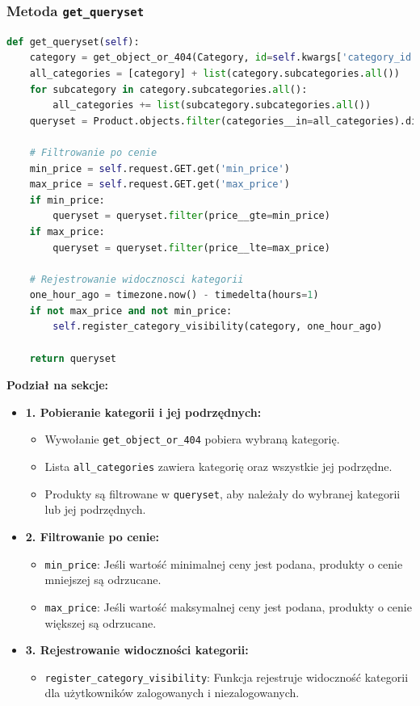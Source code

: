 \documentclass[12pt,a4paper,oneside]{article}
\theoremstyle{definition}
\numberwithin{equation}{section}
\begin{document}
\subsubsection*{Metoda \texttt{get\_queryset}}
\begin{lstlisting}[language=Python, caption=Metoda \texttt{get\_queryset}]
def get_queryset(self):
    category = get_object_or_404(Category, id=self.kwargs['category_id'])
    all_categories = [category] + list(category.subcategories.all())
    for subcategory in category.subcategories.all():
        all_categories += list(subcategory.subcategories.all())
    queryset = Product.objects.filter(categories__in=all_categories).distinct()

    # Filtrowanie po cenie
    min_price = self.request.GET.get('min_price')
    max_price = self.request.GET.get('max_price')
    if min_price:
        queryset = queryset.filter(price__gte=min_price)
    if max_price:
        queryset = queryset.filter(price__lte=max_price)

    # Rejestrowanie widocznosci kategorii
    one_hour_ago = timezone.now() - timedelta(hours=1)
    if not max_price and not min_price:
        self.register_category_visibility(category, one_hour_ago)

    return queryset
\end{lstlisting}

\textbf{Podział na sekcje:}
\begin{itemize}
    \item \textbf{1. Pobieranie kategorii i jej podrzędnych:}
    \begin{itemize}
        \item Wywołanie \texttt{get\_object\_or\_404} pobiera wybraną kategorię.
        \item Lista \texttt{all\_categories} zawiera kategorię oraz wszystkie jej podrzędne.
        \item Produkty są filtrowane w \texttt{queryset}, aby należały do wybranej kategorii lub jej podrzędnych.
    \end{itemize}

    \item \textbf{2. Filtrowanie po cenie:}
    \begin{itemize}
        \item \texttt{min\_price}: Jeśli wartość minimalnej ceny jest podana, produkty o cenie mniejszej są odrzucane.
        \item \texttt{max\_price}: Jeśli wartość maksymalnej ceny jest podana, produkty o cenie większej są odrzucane.
    \end{itemize}

    \item \textbf{3. Rejestrowanie widoczności kategorii:}
    \begin{itemize}
        \item \texttt{register\_category\_visibility}: Funkcja rejestruje widoczność kategorii dla użytkowników zalogowanych i niezalogowanych.
    \end{itemize}
\end{itemize}
\end{document}
